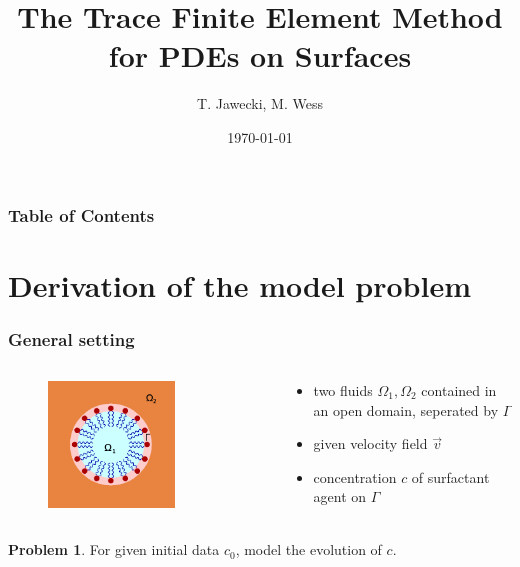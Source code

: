 \documentclass[11pt]{beamer}
\title{\textbf{The Trace Finite Element Method for PDEs on Surfaces}}
\author{T. Jawecki, M. Wess}
\date{\today}
\theoremstyle{plain}
\theoremstyle{definition}
\newtheorem{prob}[thm]{Problem}
\theoremstyle{remark}
\newcommand{\domain}{\Omega}
\newcommand{\boundary}{\Gamma}
\newcommand{\flow}{\vec v}
\begin{document}
\frame{\titlepage}

\begin{frame}
	\frametitle{Table of Contents}
	\tableofcontents
\end{frame}

\section{Derivation of the model problem}
\begin{frame}
    \frametitle{General setting}
    \begin{columns}[T]
    	\begin{column}{0.5\textwidth}
			\begin{figure}[p]
				\includegraphics[width=0.7\textwidth]{surfactant3.png}
			\end{figure}
		\end{column}
		\begin{column}{0.5\textwidth}
			\begin{itemize}[<+->]
				\item{two fluids $\domain_1,\domain_2$ contained in an open domain, seperated by $\boundary$}
				\item{given velocity field $\flow$}
				\item{concentration $c$ of surfactant agent on $\boundary$}
			\end{itemize}
		\end{column}
	\end{columns}
	\begin{prob}
		For given initial data $c_0$, model the evolution of $c$.
	\end{prob}
\end{frame}
\end{document}
